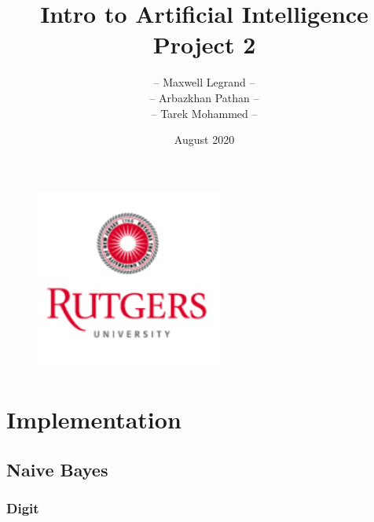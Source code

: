 \documentclass[12pt]{article}
\begin{document}
\begin{figure}[t]
\includegraphics[height=6cm]{rut}
\centering
\end{figure}
\title{\textbf{Intro to Artificial Intelligence \\ Project 2}}
\author{-- Maxwell Legrand -- \\
-- Arbazkhan Pathan -- \\
-- Tarek Mohammed --
}
\date{August 2020}



\maketitle

\pagebreak

\section{Implementation}

\subsection{Naive Bayes}

\subsubsection{Digit}
\end{document}
